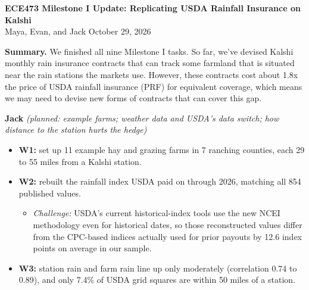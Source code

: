 \documentclass[10pt]{article}
\newcommand{\head}[1]{\par\vspace{4pt}{\large\bfseries #1}\par\vspace{1pt}}
\newcommand{\person}[2]{\par\vspace{2pt}\textbf{#1} \textit{(planned: #2)}}
\begin{document}
\begin{center}
  {\large\bfseries ECE473 Milestone I Update: Replicating USDA Rainfall
  Insurance on Kalshi}\\[1pt]
  Maya, Evan, and Jack \quad\textbullet\quad October 29, 2026
\end{center}
\vspace{-8pt}

\textbf{Summary.} We finished all nine Milestone I tasks. So far, we've devised Kalshi
monthly rain insurance contracts that can track some farmland that is situated near the rain stations the markets use. However, these contracts cost about 1.8x the price of USDA rainfall insurance (PRF) for equivalent coverage, which means we may need to devise new forms of contracts that can cover this gap.

\head{1. Planned vs.\ actual progress}

\person{Jack}{example farms; weather data and USDA's data switch; how distance
to the station hurts the hedge}
\begin{itemize}
  \item \textbf{W1:} set up 11 example hay and grazing farms in 7 ranching
    counties, each 29 to 55 miles from a Kalshi station.
  \item \textbf{W2:} rebuilt the rainfall index USDA paid on through 2026,
    matching all 854 published values.
    \begin{itemize}
      \item \emph{Challenge:} USDA's current historical-index tools use the new NCEI methodology even for historical dates, so those reconstructed values differ from the CPC-based indices actually used for prior payouts by 12.6 index points on average in our sample.
    \end{itemize}
  \item \textbf{W3:} station rain and farm rain line up only moderately
    (correlation 0.74 to 0.89), and only 7.4\% of USDA grid squares are
    within 50 miles of a station.
\end{itemize}
\end{document}

